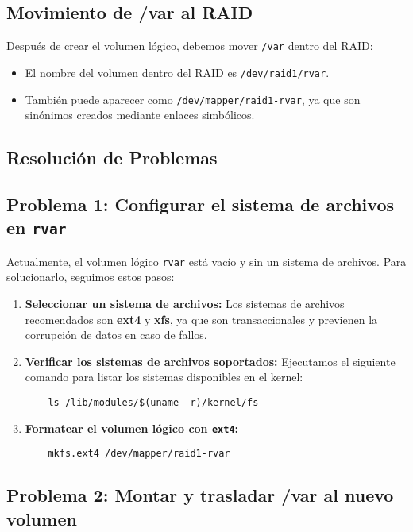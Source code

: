 \subsection{Movimiento de /var al RAID}
Después de crear el volumen lógico, debemos mover \texttt{/var} dentro del RAID:

\begin{itemize}
    \item El nombre del volumen dentro del RAID es \texttt{/dev/raid1/rvar}.
    \item También puede aparecer como \texttt{/dev/mapper/raid1-rvar}, ya que son sinónimos creados mediante enlaces simbólicos.
\end{itemize}

\subsection{Resolución de Problemas}

\subsection{Problema 1: Configurar el sistema de archivos en \texttt{rvar}}

Actualmente, el volumen lógico \texttt{rvar} está vacío y sin un sistema de archivos. Para solucionarlo, seguimos estos pasos:

\begin{enumerate}
    \item \textbf{Seleccionar un sistema de archivos:}  
    Los sistemas de archivos recomendados son \textbf{ext4} y \textbf{xfs}, ya que son transaccionales y previenen la corrupción de datos en caso de fallos.  
    \item \textbf{Verificar los sistemas de archivos soportados:}  
    Ejecutamos el siguiente comando para listar los sistemas disponibles en el kernel:
    \begin{verbatim}
    ls /lib/modules/$(uname -r)/kernel/fs
    \end{verbatim}
    \item \textbf{Formatear el volumen lógico con \texttt{ext4}:}
    \begin{verbatim}
    mkfs.ext4 /dev/mapper/raid1-rvar
    \end{verbatim}
\end{enumerate}

\subsection{Problema 2: Montar y trasladar /var al nuevo volumen}

